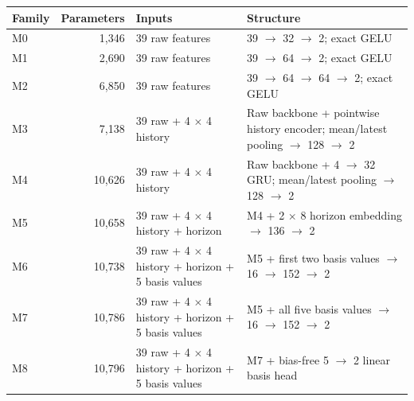 \small\setlength{\tabcolsep}{3pt}\begin{tabularx}{\textwidth}{@{}lrlX@{}}
\toprule
Family & Parameters & Inputs & Structure \\
\midrule
M0 & 1,346 & 39 raw features & 39 $\to$ 32 $\to$ 2; exact GELU \\
M1 & 2,690 & 39 raw features & 39 $\to$ 64 $\to$ 2; exact GELU \\
M2 & 6,850 & 39 raw features & 39 $\to$ 64 $\to$ 64 $\to$ 2; exact GELU \\
M3 & 7,138 & 39 raw + 4 $\times$ 4 history & Raw backbone + pointwise history encoder; mean/latest pooling $\to$ 128 $\to$ 2 \\
M4 & 10,626 & 39 raw + 4 $\times$ 4 history & Raw backbone + 4 $\to$ 32 GRU; mean/latest pooling $\to$ 128 $\to$ 2 \\
M5 & 10,658 & 39 raw + 4 $\times$ 4 history + horizon & M4 + 2 $\times$ 8 horizon embedding $\to$ 136 $\to$ 2 \\
M6 & 10,738 & 39 raw + 4 $\times$ 4 history + horizon + 5 basis values & M5 + first two basis values $\to$ 16 $\to$ 152 $\to$ 2 \\
M7 & 10,786 & 39 raw + 4 $\times$ 4 history + horizon + 5 basis values & M5 + all five basis values $\to$ 16 $\to$ 152 $\to$ 2 \\
M8 & 10,796 & 39 raw + 4 $\times$ 4 history + horizon + 5 basis values & M7 + bias-free 5 $\to$ 2 linear basis head \\
\bottomrule
\end{tabularx}

